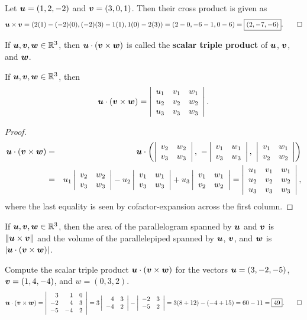 \begin{Exam} Let $\bb u = (1,2,-2)$ and $\bb v = (3,0,1)$. Then their cross product is given as
\[\bb u \times \bb v = (2(1) - (-2)(0), (-2)(3) - 1(1), 1(0) - 2(3)) = (2-0, -6-1, 0-6) = \fbox{$(2, -7, -6)$}.\qedhere\]
\end{Exam}\vs

\begin{Def} If $\bb u, \bb v, \bb w\in \R^3$, then $\bb u \cdot (\bb v \times \bb w)$ is called the \textbf{scalar triple product} of $\bb u$, $\bb v$, and $\bb w$. 
\end{Def}\vs

\begin{Thm} If $\bb u, \bb v, \bb w\in \R^3$, then 
\[\bb u \cdot (\bb v \times \bb w) = \dtx{rrr}{u_1 & v_1 & w_1 \\  u_2 & v_2 & w_2 \\  u_3 & v_3 & w_3}.\]
\end{Thm}
\begin{proof}
\begin{eqnarray*}
\bb u \cdot (\bb v \times \bb w) &=& \bb u \cdot \left( \dtx{rr}{v_2 & w_2 \\ v_3 & w_3},\ -\dtx{rr}{v_1 & w_1 \\ v_3 & w_3},\ \dtx{rr}{v_1 & w_1 \\ v_2 & w_2}\right)\\
&=& u_1\dtx{rr}{v_2 & w_2 \\ v_3 & w_3} -u_2\dtx{rr}{v_1 & w_1 \\ v_3 & w_3} + u_3\dtx{rr}{v_1 & w_1 \\ v_2 & w_2} = \dtx{rrr}{u_1 & v_1 & w_1 \\  u_2 & v_2 & w_2 \\  u_3 & v_3 & w_3},
\end{eqnarray*} where the last equality is seen by cofactor-expansion across the first column.
\end{proof}\vs

\begin{Cor} If $\bb u, \bb v, \bb w \in \R^3$, then the area of the parallelogram spanned by $\bb u$ and $\bb v$ is $\Vert \bb u\times \bb v\Vert$ and the volume of the parallelepiped spanned by $\bb u$, $\bb v$, and $\bb w$ is $|\bb u \cdot (\bb v\times \bb w)|$.
\end{Cor}\vs

\begin{Exam} Compute the scalar triple product $\bb u \cdot (\bb v\times \bb w)$ for the vectors $\bb u = (3,-2,-5)$, $\bb v = (1,4,-4)$, and $w=(0,3,2)$.
\[\bb u \cdot (\bb v\times \bb w) = \dtx{rrr}{3 & 1 & 0 \\  -2 & 4 & 3 \\  -5 & -4 & 2} = 3\dtx{rr}{4 & 3 \\ -4 & 2} - \dtx{rr}{-2 & 3\\ -5 & 2} = 3(8+12) - (-4+15) = 60 - 11 = \fbox{$49$}. \qedhere\]
\end{Exam}\vs

